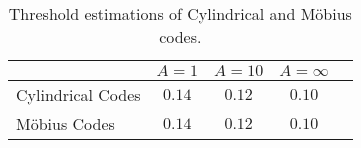 \begin{table}[t]
    \centering
    \caption{Threshold estimations of Cylindrical and M\"{o}bius codes.}
    \label{tab:thre}
    \begin{tabular}{l c c c c}
    \toprule
         & $A = 1$ & $A = 10$ & $A = \infty$ \\
    \midrule
        Cylindrical Codes & $0.14$ & $0.12$ & $0.10$ \\
         M\"{o}bius Codes & $0.14$ & $0.12$ & $0.10$ \\
    \bottomrule
    \end{tabular}
\end{table}